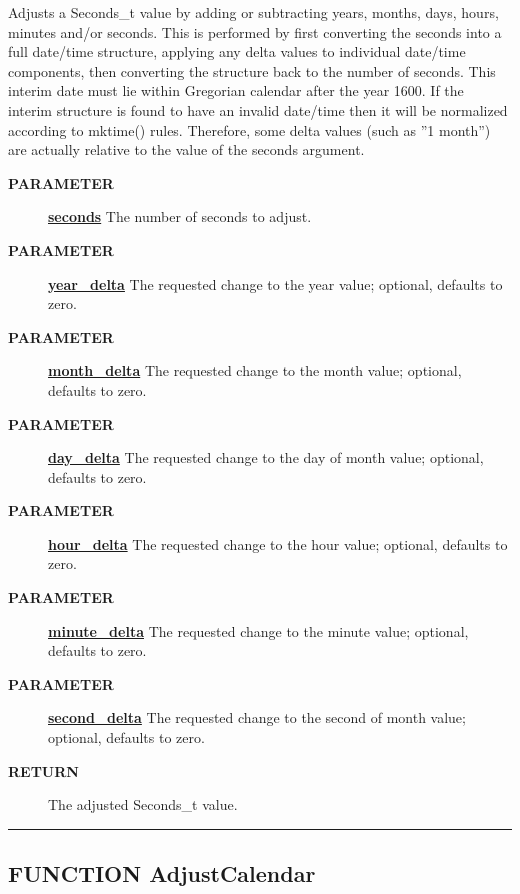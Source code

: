 \par
Adjusts a Seconds\_t value by adding or subtracting years, months, days, hours, minutes and/or seconds. This is performed by first converting the seconds into a full date/time structure, applying any delta values to individual date/time components, then converting the structure back to the number of seconds. This interim date must lie within Gregorian calendar after the year 1600. If the interim structure is found to have an invalid date/time then it will be normalized according to mktime() rules. Therefore, some delta values (such as ''1 month'') are actually relative to the value of the seconds argument.

\par
\begin{description}
\item [\colorbox{tagtype}{\color{white} \textbf{\textsf{PARAMETER}}}] \textbf{\underline{seconds}} The number of seconds to adjust.
\item [\colorbox{tagtype}{\color{white} \textbf{\textsf{PARAMETER}}}] \textbf{\underline{year\_delta}} The requested change to the year value; optional, defaults to zero.
\item [\colorbox{tagtype}{\color{white} \textbf{\textsf{PARAMETER}}}] \textbf{\underline{month\_delta}} The requested change to the month value; optional, defaults to zero.
\item [\colorbox{tagtype}{\color{white} \textbf{\textsf{PARAMETER}}}] \textbf{\underline{day\_delta}} The requested change to the day of month value; optional, defaults to zero.
\item [\colorbox{tagtype}{\color{white} \textbf{\textsf{PARAMETER}}}] \textbf{\underline{hour\_delta}} The requested change to the hour value; optional, defaults to zero.
\item [\colorbox{tagtype}{\color{white} \textbf{\textsf{PARAMETER}}}] \textbf{\underline{minute\_delta}} The requested change to the minute value; optional, defaults to zero.
\item [\colorbox{tagtype}{\color{white} \textbf{\textsf{PARAMETER}}}] \textbf{\underline{second\_delta}} The requested change to the second of month value; optional, defaults to zero.
\item [\colorbox{tagtype}{\color{white} \textbf{\textsf{RETURN}}}] \textbf{\underline{}} The adjusted Seconds\_t value.
\end{description}

\rule{\linewidth}{0.5pt}
\subsection*{\textsf{\colorbox{headtoc}{\color{white} FUNCTION}
AdjustCalendar}}

